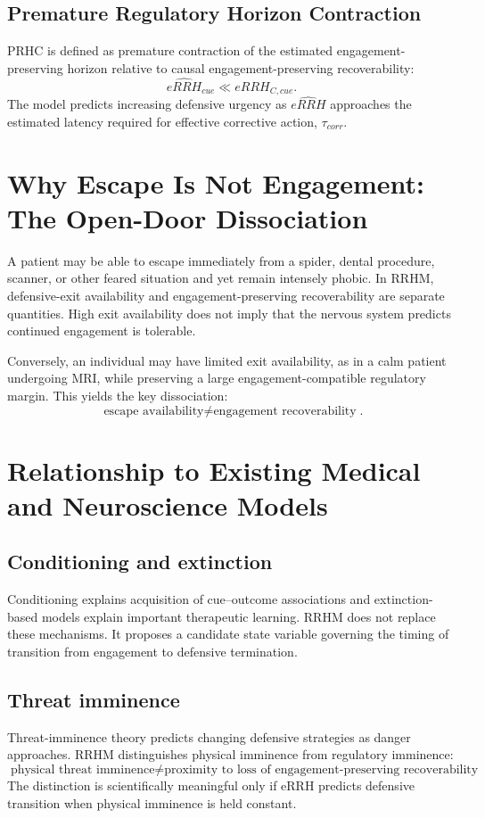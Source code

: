 \documentclass[11pt]{article}
\begin{document}
\subsection{Premature Regulatory Horizon Contraction}
PRHC is defined as premature contraction of the estimated engagement-preserving horizon relative to causal engagement-preserving recoverability:
\[
\widehat{eRRH}_{cue}\ll eRRH_{C,cue}.
\]
The model predicts increasing defensive urgency as $\widehat{eRRH}$ approaches the estimated latency required for effective corrective action, $\tau_{corr}$.

\section{Why Escape Is Not Engagement: The Open-Door Dissociation}
A patient may be able to escape immediately from a spider, dental procedure, scanner, or other feared situation and yet remain intensely phobic. In RRHM, defensive-exit availability and engagement-preserving recoverability are separate quantities. High exit availability does not imply that the nervous system predicts continued engagement is tolerable.

Conversely, an individual may have limited exit availability, as in a calm patient undergoing MRI, while preserving a large engagement-compatible regulatory margin. This yields the key dissociation:
\[
\boxed{\text{escape availability}\neq\text{engagement recoverability}}.
\]

\section{Relationship to Existing Medical and Neuroscience Models}
\subsection{Conditioning and extinction}
Conditioning explains acquisition of cue--outcome associations and extinction-based models explain important therapeutic learning. RRHM does not replace these mechanisms. It proposes a candidate state variable governing the timing of transition from engagement to defensive termination.

\subsection{Threat imminence}
Threat-imminence theory predicts changing defensive strategies as danger approaches. RRHM distinguishes physical imminence from regulatory imminence:
\[
\boxed{\text{physical threat imminence}\neq\text{proximity to loss of engagement-preserving recoverability}}.
\]
The distinction is scientifically meaningful only if eRRH predicts defensive transition when physical imminence is held constant.
\end{document}
